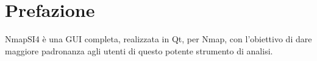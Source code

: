 
\chapter*{Prefazione}
\label{ch:Preface}

NmapSI4 \`e una GUI completa, realizzata in Qt, per Nmap, con l'obiettivo di 
dare maggiore padronanza agli utenti di questo potente strumento di analisi.
